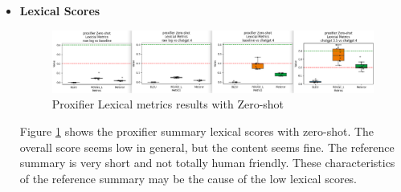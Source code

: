 \documentclass[conference]{IEEEtran}
\begin{document}
\begin{itemize}
   \textbf{ Sample summary with few-shot}
    \begin{itemize}
    \item proxifier log summary: 
    \begin{lstlisting}[numbers=none]
{
  "summary": "Multiple connections opened and closed through proxy.cse.cuhk.edu.hk with varying data transfer sizes.",
  "throughput": "Average throughput: 0.5 MB/s",
  "anomaly": "No anomalies detected."
}
{
"summary": "Multiple connections opened and closed via proxy, some with errors.",
"throughput": "Total sent: 1593 bytes, Total received: 1235 bytes",
"anomaly": "Unexpected proxy closure on tcpconn4.tencent.com"
}
\end{lstlisting}
It is impressive to see Chatgpt is able to calculate the throughput on the fly. however, the accuracy is a big concern as most of number it printed are not correct
\begin{lstlisting}[numbers=none]
{
  "summary": "Processed session terminations and expirations, accepted socket connection, warnings, and closed socket connection.",
  "anomaly": "None"
}
{"summary": "Multiple session terminations processed, some sessions expired due to timeout, one client connection closed.", 
"anomaly": "Old client connection request, end of stream exception caught."
}
\end{lstlisting}

    \end{itemize}

   \item  \textbf{Lexical Scores}

    \begin{figure}[ht]
        \centering
        \includegraphics[width=\textwidth]{milestone4/proxifier_lexical_zero_shot.png}
       \caption{Proxifier Lexical metrics results with Zero-shot}        \label{fig:plz}
    \end{figure} 
    
    Figure \ref{fig:plz} shows the proxifier summary lexical scores with zero-shot. The overall score seems low in general, but the content seems fine. The reference summary is very short and not totally human friendly. These characteristics of the reference summary may be the cause of the low lexical scores.
    

\end{itemize}
\end{document}
